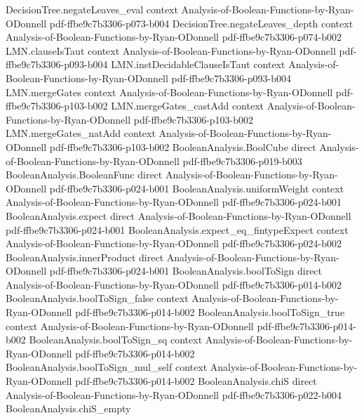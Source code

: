 \begin{lemma}
  {DecisionTree.negateLeaves_eval}
  {context}
  {Analysis-of-Boolean-Functions-by-Ryan-ODonnell}
  {pdf-ffbe9c7b3306-p073-b004}
\proofstep
  {DecisionTree.negateLeaves_depth}
  {context}
  {Analysis-of-Boolean-Functions-by-Ryan-ODonnell}
  {pdf-ffbe9c7b3306-p074-b002}
\proofstep
  {LMN.clauseIsTaut}
  {context}
  {Analysis-of-Boolean-Functions-by-Ryan-ODonnell}
  {pdf-ffbe9c7b3306-p093-b004}
\proofstep
  {LMN.instDecidableClauseIsTaut}
  {context}
  {Analysis-of-Boolean-Functions-by-Ryan-ODonnell}
  {pdf-ffbe9c7b3306-p093-b004}
\proofstep
  {LMN.mergeGates}
  {context}
  {Analysis-of-Boolean-Functions-by-Ryan-ODonnell}
  {pdf-ffbe9c7b3306-p103-b002}
\proofstep
  {LMN.mergeGates_castAdd}
  {context}
  {Analysis-of-Boolean-Functions-by-Ryan-ODonnell}
  {pdf-ffbe9c7b3306-p103-b002}
\proofstep
  {LMN.mergeGates_natAdd}
  {context}
  {Analysis-of-Boolean-Functions-by-Ryan-ODonnell}
  {pdf-ffbe9c7b3306-p103-b002}
\proofstep
  {BooleanAnalysis.BoolCube}
  {direct}
  {Analysis-of-Boolean-Functions-by-Ryan-ODonnell}
  {pdf-ffbe9c7b3306-p019-b003}
\proofstep
  {BooleanAnalysis.BooleanFunc}
  {direct}
  {Analysis-of-Boolean-Functions-by-Ryan-ODonnell}
  {pdf-ffbe9c7b3306-p024-b001}
\proofstep
  {BooleanAnalysis.uniformWeight}
  {context}
  {Analysis-of-Boolean-Functions-by-Ryan-ODonnell}
  {pdf-ffbe9c7b3306-p024-b001}
\proofstep
  {BooleanAnalysis.expect}
  {direct}
  {Analysis-of-Boolean-Functions-by-Ryan-ODonnell}
  {pdf-ffbe9c7b3306-p024-b001}
\proofstep
  {BooleanAnalysis.expect_eq_fintypeExpect}
  {context}
  {Analysis-of-Boolean-Functions-by-Ryan-ODonnell}
  {pdf-ffbe9c7b3306-p024-b002}
\proofstep
  {BooleanAnalysis.innerProduct}
  {direct}
  {Analysis-of-Boolean-Functions-by-Ryan-ODonnell}
  {pdf-ffbe9c7b3306-p024-b001}
\proofstep
  {BooleanAnalysis.boolToSign}
  {direct}
  {Analysis-of-Boolean-Functions-by-Ryan-ODonnell}
  {pdf-ffbe9c7b3306-p014-b002}
\proofstep
  {BooleanAnalysis.boolToSign_false}
  {context}
  {Analysis-of-Boolean-Functions-by-Ryan-ODonnell}
  {pdf-ffbe9c7b3306-p014-b002}
\proofstep
  {BooleanAnalysis.boolToSign_true}
  {context}
  {Analysis-of-Boolean-Functions-by-Ryan-ODonnell}
  {pdf-ffbe9c7b3306-p014-b002}
\proofstep
  {BooleanAnalysis.boolToSign_sq}
  {context}
  {Analysis-of-Boolean-Functions-by-Ryan-ODonnell}
  {pdf-ffbe9c7b3306-p014-b002}
\proofstep
  {BooleanAnalysis.boolToSign_mul_self}
  {context}
  {Analysis-of-Boolean-Functions-by-Ryan-ODonnell}
  {pdf-ffbe9c7b3306-p014-b002}
\proofstep
  {BooleanAnalysis.chiS}
  {direct}
  {Analysis-of-Boolean-Functions-by-Ryan-ODonnell}
  {pdf-ffbe9c7b3306-p022-b004}
\proofstep
  {BooleanAnalysis.chiS_empty}

\end{lemma}
